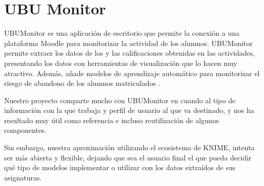 
\section{UBU Monitor}

UBUMonitor es una aplicación de escritorio que permite la conexión a una plataforma Moodle para monitorizar la actividad
de los alumnos. UBUMonitor permite extraer los datos de los  y las calificaciones obtenidas en las actividades, presentando 
los datos con herramientas de visualización que lo hacen muy atractivo. Además, añade modelos de aprendizaje automático 
para monitorizar el riesgo de abandono de los alumnos matriculados \cite{ubumonitor} \cite{marticorena2022ubumonitor}. 
\

Nuestro proyecto comparte mucho con UBUMonitor en cuando al tipo de información con la que trabaja y perfil de usuario al que
 va destinado, y nos ha resultado muy útil como referencia e incluso reutilización de algunos componentes. 
\

Sin embargo, nuestra aproximación utilizando el ecosistema de KNIME, intenta ser más abierta y flexible, dejando que sea 
el usuario final el que pueda decidir qué tipo de modelos implementar o utilizar con los datos extraídos de sus asignaturas. 


